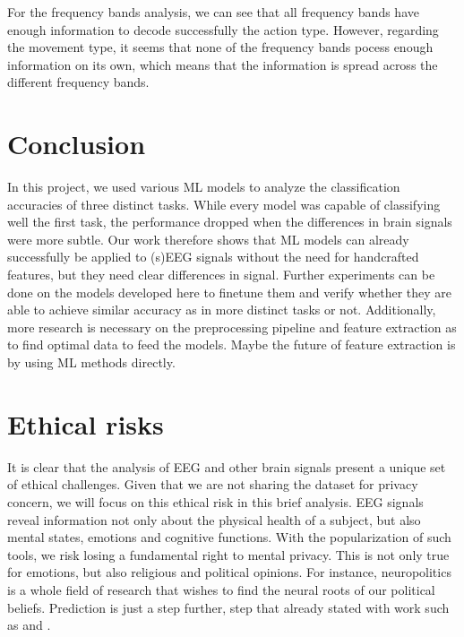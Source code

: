 \documentclass[10pt,conference,compsocconf]{IEEEtran}
\begin{document}
For the frequency bands analysis, we can see that all frequency bands have enough information to decode successfully the action type. However, regarding the movement type, it seems that none of the frequency bands pocess enough information on its own, which means that the information is spread across the different frequency bands.

\section{Conclusion}
\label{sec:conclusion}
In this project, we used various ML models to analyze the classification accuracies of three distinct tasks. While every model was capable of classifying well the first task, the performance dropped when the differences in brain signals were more subtle. Our work therefore shows that ML models can already successfully be applied to (s)EEG signals without the need for handcrafted features, but they need clear differences in signal. Further experiments can be done on the models developed here to finetune them and verify whether they are able to achieve similar accuracy as in more distinct tasks or not. Additionally, more research is necessary on the preprocessing pipeline and feature extraction as to find optimal data to feed the models. Maybe the future of feature extraction is by using ML methods directly.

\newpage
\section{Ethical risks}
It is clear that the analysis of EEG and other brain signals present a unique set of ethical challenges. Given that we are not sharing the dataset for privacy concern, we will focus on this ethical risk in this brief analysis. EEG signals reveal information not only about the physical health of a subject, but also mental states, emotions and cognitive functions. With the popularization of such tools, we risk losing a fundamental right to mental privacy. This is not only true for emotions, but also religious and political opinions. For instance, neuropolitics\cite{neuropolitics} is a whole field of research that wishes to find the neural roots of our political beliefs. Prediction is just a step further, step that already stated with work such as \cite{galli_early_2021} and \cite{yun_erp_2022}.
\end{document}
